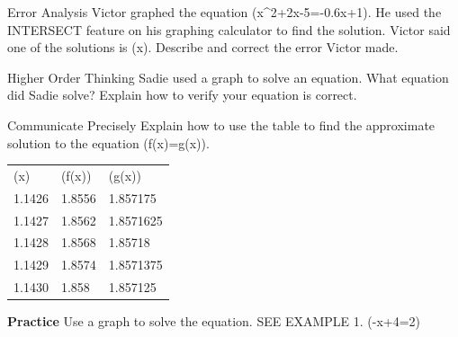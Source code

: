 \documentclass{article}
\newenvironment{practice}[2]{}{}        %
\newcommand{\answer}[1]{}               %
\newcommand{\placeholder}[2]{}          %
\begin{document}
\begin{practice}{6}{2}
Error Analysis Victor graphed the equation (x^2+2x-5=-0.6x+1). He used the INTERSECT feature on his graphing calculator to find the solution. Victor said one of the solutions is (x). Describe and correct the error Victor made.
\placeholder{graph}{Unit grid with x,y axes and arrows; labels -4,-2,O,2,4. Red upward parabola y=x^2+2x-5 vertex (-1,-6), blue line y=-0.6x+1. Red marked right intersection near (1.47,0.116), another intersection near (-4.07,3.44). Curves have endpoint arrows; large red X at lower right marks the erroneous answer. Window approximately x [-6,6], y [-7,5].}
\answer{Victor incorrectly said the solution is the y-value of one of the points of intersection instead of the x-value. One solution is (x\approx1.47).}
\end{practice}
\begin{practice}{7}{3}
Higher Order Thinking Sadie used a graph to solve an equation. What equation did Sadie solve? Explain how to verify your equation is correct.
\placeholder{graph}{Unit square grid, x,y axes with arrows and labels -4,-2,O,2,4. Blue line y=2x+3 and red inverted V y=-|x+1|-1, vertex (-1,-1); intersection (-3,-3). Both curves have arrows on both ends. Window [-5,5] on both axes.}
\answer{(2x+3=-|x+1|-1); The graph shows the solution is at (x=-3). Substitute (-3) for x in the equation: (2(-3)+3=-|(-3)+1|-1). Simplify the equation to see if it results in a true statement: (-3=-3).}
\end{practice}
\begin{practice}{8}{2}
Communicate Precisely Explain how to use the table to find the approximate solution to the equation (f(x)=g(x)).
\begin{tabular}{lll}
(x) & (f(x)) & (g(x)) \\
1.1426 & 1.8556 & 1.857175 \\
1.1427 & 1.8562 & 1.8571625 \\
1.1428 & 1.8568 & 1.85718 \\
1.1429 & 1.8574 & 1.8571375 \\
1.1430 & 1.858 & 1.857125 \\
\end{tabular}
\answer{For (x=1.1426), (x=1.1427), and (x=1.1428), (f(x)<g(x)). For (x=1.1429) and (x=1.1430), (g(x)<f(x)). So, the solution of (f(x)=g(x)) is between (x=1.1428) and (x=1.1429).}
\end{practice}
\begin{practice}{9}{1}
\textbf{Practice} Use a graph to solve the equation. SEE EXAMPLE 1.
(-x+4=2)
\answer{(x=2)}
\end{practice}
\end{document}
